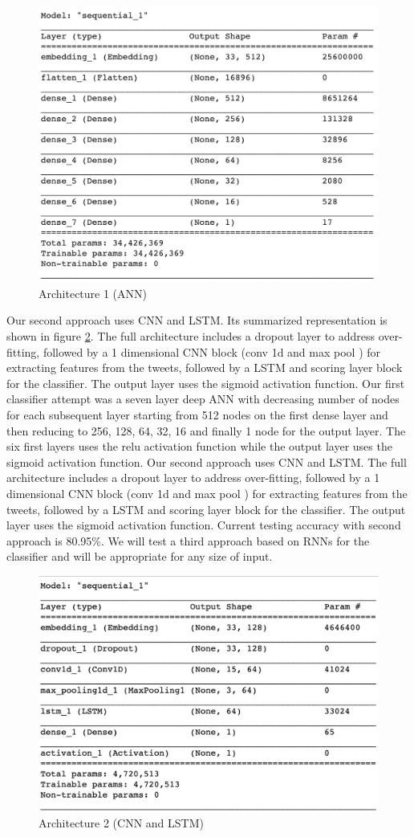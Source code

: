 \documentclass[conference]{sig-alternate-05-2015}
\begin{document}
\begin{figure}
	\centering
	\includegraphics[width=0.8\linewidth]{"model ANN"}
	\caption{Architecture 1 (ANN)}
	\label{fig:model ANN}
\end{figure}

Our second approach uses CNN and LSTM. Its summarized representation is shown in figure \ref{fig:model CNN LSTM}. The full architecture includes a dropout layer to address over-fitting, followed by a 1 dimensional CNN block (conv 1d and max pool ) for extracting features from the tweets, followed by a LSTM and scoring layer block for the classifier. The output layer uses the sigmoid activation function.
Our first classifier attempt was a seven layer deep ANN with decreasing number of nodes for each subsequent layer starting from 512 nodes on the first dense layer and then reducing to 256, 128, 64, 32, 16 and finally 1 node for the output layer. The six first layers uses the relu activation function while the output layer uses the sigmoid activation function.
Our second approach uses CNN and LSTM. The full architecture includes a dropout layer to address over-fitting, followed by a 1 dimensional CNN block (conv 1d and max pool ) for extracting features from the tweets, followed by a LSTM and scoring layer block for the classifier. The output layer uses the sigmoid activation function. Current testing accuracy with second approach is 80.95\%.
We will test a third approach based on RNNs for the classifier and will be appropriate for any size of input.
\begin{figure}
	\centering
	\includegraphics[width=0.8\linewidth]{"model CNN LSTM"}
	\caption{Architecture 2 (CNN and LSTM)}
	\label{fig:model CNN LSTM}
\end{figure}
\end{document}
